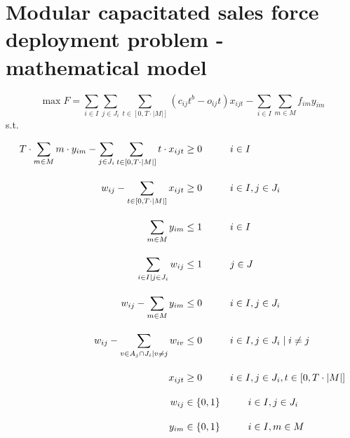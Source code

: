 \documentclass{article}
\begin{document}
\section{Modular capacitated sales force deployment problem - mathematical model}
 \vspace{4em}
\begin{equation}
     \max F = \sum_{i \in I} \sum_{j \in J_i} \sum_{t \in [0,T \cdot |M|]} (c_{ij}t^b - o_{ij}t)  x_{ijt} - \sum_{i \in I} \sum_{m \in M} f_{im} y_{im}
\end{equation}
s.t.

\begin{align}
     T \cdot \sum_{m \in M}m \cdot y_{im} - \sum_{ j \in J_i} \sum_{t\in [0,T \cdot |M|]} t \cdot x_{ijt}  &\ge 0   \hspace*{1cm} i \in I \\[1em]
     w_{ij} - \sum_{t \in \left[0,T \cdot |M| \right]}x_{ijt} &\ge 0  \hspace*{1cm} i \in I, j \in J_i \\[1em]
     \sum_{m \in M} y_{im} &\le 1 \hspace*{1cm} i \in I \\[1em]
     \sum_{i \in I\mid j \in J_i} w_{ij}  & \le 1 \hspace*{1cm} j \in J \\[1em]
     w_{ij} - \sum_{m \in M} y_{im} &\le 0     \hspace*{1cm} i \in I,  j \in J_i \\[1em]
     w_{ij} - \sum_{v \in A_j \cap J_i \mid v \ne j} w_{iv} & \le 0 \hspace*{1cm} i \in I,  j \in J_i \mid i \ne j \\[1em]
     x_{ijt} &\geq 0 \hspace*{1cm} i \in I, j \in J_i, t \in \left[0,T\cdot \left|M\right|\right] \\[1em]
     w_{ij} &\in \{0,1\} \hspace*{1cm} i \in I, j \in J_i \\[1em]
     y_{im} &\in \{0,1\} \hspace*{1cm} i \in I, m \in M
\end{align}
\end{document}

